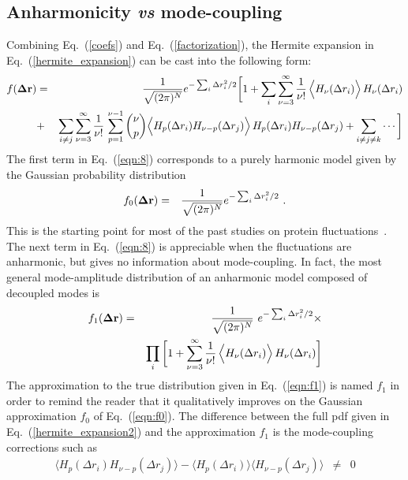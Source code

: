 \documentclass[12pt,article]{iopart}
\begin{document}
\subsection{Anharmonicity {\it vs} mode-coupling}

Combining Eq.~(\ref{coefs}) and Eq.~(\ref{factorization}), the Hermite
expansion in Eq.~(\ref{hermite_expansion}) can be cast into the
following form:
\begin{eqnarray}
\label{hermite_expansion2}
f({\bf\Delta r}) &=& \frac{1}{\sqrt{(2\pi)^N}} e^{ -\sum_i \Delta
  r_i^2/2} \bigg[ 1 + \sum_i\sum_{\nu=3}^\infty
  \frac{1}{\nu!}\, \Big\langle
  H_\nu(\Delta r_i)\Big\rangle\,H_\nu(\Delta r_i) \\
&+&  \sum_{i\ne j}\sum_{\nu=3}^\infty
  \frac{1}{\nu!}\,\sum_{p=1}^{\nu-1} {\nu\choose p} \Big\langle
  H_p(\Delta r_i)H_{\nu-p}(\Delta r_j)\Big\rangle\,H_p(\Delta r_i)H_{\nu-p}(\Delta r_j) + \sum_{i\ne j\ne k} \cdots \bigg] \nonumber
\label{eqn:8}
\end{eqnarray}
The first term in Eq.~(\ref{eqn:8}) corresponds to a purely harmonic model given by
the Gaussian probability distribution
\begin{eqnarray}
\label{eqn:f0}
f_0({\bf\Delta r}) &=& \frac{1}{\sqrt{(2\pi)^N}} e^{ -\sum_i \Delta
  r_i^2/2}\ .
\end{eqnarray}
This is the starting point for most of the past studies on protein
fluctuations~\cite{cui2006normal}. The next term in Eq.~(\ref{eqn:8}) is
appreciable when the fluctuations are anharmonic, but gives no information
about mode-coupling. In fact, the most general mode-amplitude
distribution of an anharmonic model composed of decoupled modes is
\begin{eqnarray}
\label{eqn:f1}
f_1({\bf\Delta r}) &=& \frac{1}{\sqrt{(2\pi)^N}}\ e^{ -\sum_i \Delta
  r_i^2/2} \times  \nonumber \\
&& \prod_i\bigg[ 1 + \sum_{\nu=3}^\infty
  \frac{1}{\nu!}\, \Big\langle
  H_\nu(\Delta r_i)\Big\rangle\,H_\nu(\Delta r_i)\bigg] 
\end{eqnarray}
The approximation to the true distribution given in
Eq.~(\ref{eqn:f1}) is named $f_1$ in order to remind the reader
that it qualitatively improves on the Gaussian approximation $f_0$
of Eq.~(\ref{eqn:f0}). The difference between the full pdf given in
Eq.~(\ref{hermite_expansion2}) and the approximation $f_1$ is the
mode-coupling corrections such as
\begin{eqnarray}
\langle H_p(\Delta r_i)H_{\nu-p}(\Delta r_j)\rangle - \langle
H_p(\Delta r_i)\rangle\langle H_{\nu-p}(\Delta r_j)\rangle &\neq& 0 \nonumber
\end{eqnarray}
\end{document}
